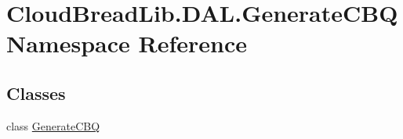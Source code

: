 \hypertarget{a00435}{}\section{Cloud\+Bread\+Lib.\+D\+A\+L.\+Generate\+C\+BQ Namespace Reference}
\label{a00435}
\subsection*{Classes}
\begin{DoxyCompactItemize}
\item 
class \hyperlink{a00085}{Generate\+C\+BQ}
\end{DoxyCompactItemize}
